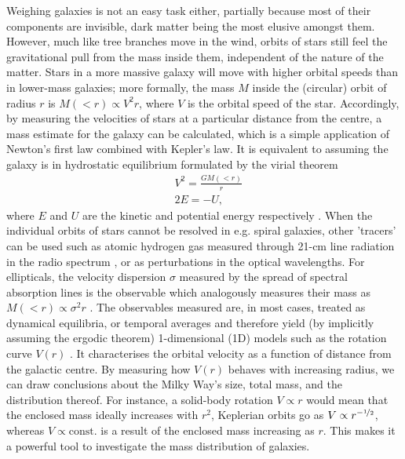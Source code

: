 Weighing galaxies is not an easy task either, partially because most of their
components are invisible, dark matter being the most elusive amongst them.
However, much like tree branches move in the wind, orbits of stars still feel
the gravitational pull from the mass inside them, independent of the nature of
the matter.  Stars in a more massive galaxy will move with higher orbital speeds
than in lower-mass galaxies; more formally, the mass $M$ inside the (circular)
orbit of radius $r$ is $M(<r) \propto V^{2}r$, where $V$ is the orbital speed of
the star.  Accordingly, by measuring the velocities of stars at a particular
distance from the centre, a mass estimate for the galaxy can be calculated,
which is a simple application of Newton's first law combined with Kepler's law.
It is equivalent to assuming the galaxy is in hydrostatic equilibrium formulated
by the virial theorem 
\begin{equation}
    \begin{aligned}
        &V^{2} = \frac{GM(<r)}{r}\\
        &2E = -U,
    \end{aligned}
\end{equation}
where $E$ and $U$ are the kinetic and potential energy respectively
.  When the individual orbits of stars
cannot be resolved in {e.g.} spiral galaxies, other 'tracers' can be used such
as atomic hydrogen gas measured through 21-cm line radiation in the radio
spectrum , or as
perturbations in the optical wavelengths.  For ellipticals, the velocity
dispersion $\sigma$ measured by the spread of spectral absorption lines is the
observable which analogously measures their mass as $M(<r) \propto \sigma^{2}r$
.  The observables measured are, in most cases,
treated as dynamical equilibria, or temporal averages and therefore yield (by
implicitly assuming the ergodic theorem) 1-dimensional (1D) models such as the
rotation curve $V(r)$ .  It characterises
the orbital velocity as a function of distance from the galactic centre. By
measuring how $V(r)$ behaves with increasing radius, we can draw conclusions
about the Milky Way's size, total mass, and the distribution thereof.  For
instance, a solid-body rotation $V \propto r$ would mean that the enclosed mass
ideally increases with $r^{2}$, Keplerian orbits go as $V \propto r^{-\mathrm{\nicefrac{1}{2}}}$,
whereas $V \propto \text{const.}$ is a result of the enclosed mass increasing as
$r$.  This makes it a powerful tool to investigate the mass distribution of
galaxies.

